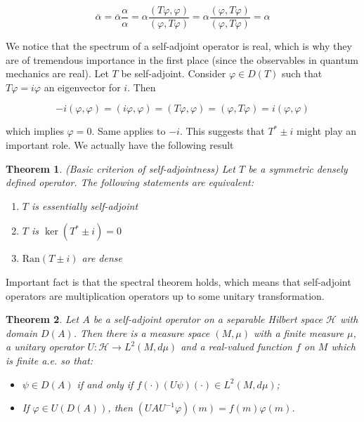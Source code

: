\documentclass[11pt, a4paper, german]{article}
\theoremstyle{plain}
\newtheorem{theorem}{Theorem}
\theoremstyle{definition}
\theoremstyle{remark}
\numberwithin{equation}{section}
\numberwithin{theorem}{section}
\begin{document}
\begin{equation}
\overline \alpha = \overline \alpha \frac \alpha \alpha = \alpha \frac{(T\varphi, \varphi)}{(\varphi, T\varphi)} = \alpha \frac{(\varphi, T\varphi)}{(\varphi, T\varphi)} = \alpha
\end{equation}

We notice that the spectrum of a self-adjoint operator is real, which is why they are of tremendous importance in the first place (since the observables in quantum mechanics are real). Let $T$ be self-adjoint. Consider $\varphi \in D(T)$ such that $T\varphi=i\varphi$ an eigenvector for $i$. Then

\begin{equation}
-i(\varphi, \varphi) = (i\varphi,\varphi) = (T\varphi,\varphi) = (\varphi, T\varphi) = i(\varphi,\varphi)
\end{equation}

which implies $\varphi = 0$. Same applies to $-i$. This suggests that $T^*\pm i$ might play an important role. We actually have the following result

\begin{theorem} (Basic criterion of self-adjointness) Let $T$ be a symmetric densely defined operator. The following statements are equivalent:

\begin{enumerate}
\item $T$ is essentially self-adjoint
\item $T$ is $\ker(T^*\pm i) = 0$
\item $\text{Ran}(T\pm i)$ are dense
\end{enumerate}

\end{theorem}

Important fact is that the spectral theorem holds, which means that self-adjoint operators are multiplication operators up to some unitary transformation.

\begin{theorem}
Let $A$ be a self-adjoint operator on a separable Hilbert space $\mathcal H$ with domain $D(A)$. Then there is a measure space $(M, \mu)$ with a finite measure $\mu$, a unitary operator $U: \mathcal H \rightarrow L^2(M, d\mu)$ and a real-valued function $f$ on $M$ which is finite a.e. so that:

\begin{itemize}
\item $\psi \in D(A)$ if and only if $f(\cdot)(U\psi)(\cdot)\in L^2(M, d\mu)$;
\item If $\varphi \in U(D(A))$, then $(UAU^{-1} \varphi)(m) = f(m)\varphi(m)$.
\end{itemize}
\end{theorem}
\end{document}
